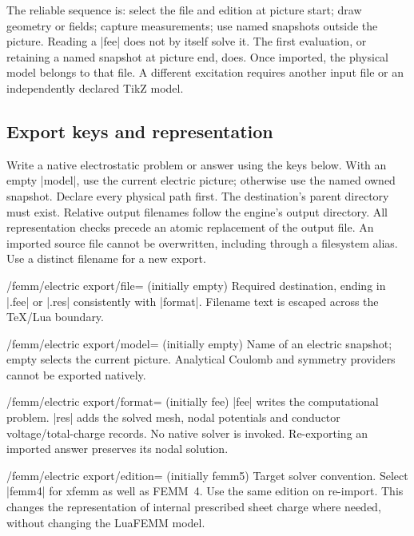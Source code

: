 The reliable sequence is: select the file and edition at picture start; draw
geometry or fields; capture measurements; use named snapshots outside the
picture. Reading a |fee| does not by itself solve it. The first evaluation, or
retaining a named snapshot at picture end, does. Once imported, the physical
model belongs to that file. A different excitation requires another input file
or an independently declared TikZ model.

\subsection{Export keys and representation}
\begin{command}{\femmelectricexport{}}
  Write a native electrostatic problem or answer using the keys below. With an
  empty |model|, use the current electric picture; otherwise use the named owned
  snapshot. Declare every physical path first. The destination's parent directory
  must exist. Relative output filenames follow the engine's output directory.
  All representation checks precede an atomic replacement of the output file.
  An imported source file cannot be overwritten, including through a filesystem
  alias. Use a distinct filename for a new export.
\end{command}
\begin{key}{/femm/electric export/file= (initially empty)}
  Required destination, ending in |.fee| or |.res| consistently with |format|.
  Filename text is escaped across the TeX/Lua boundary.
\end{key}
\begin{key}{/femm/electric export/model= (initially empty)}
  Name of an electric snapshot; empty selects the current picture.
  Analytical Coulomb and symmetry providers cannot be exported natively.
\end{key}
\begin{key}{/femm/electric export/format= (initially fee)}
  |fee| writes the computational problem. |res| adds the solved mesh, nodal
  potentials and conductor voltage/total-charge records. No native solver is
  invoked. Re-exporting an imported answer preserves its nodal solution.
\end{key}
\begin{key}{/femm/electric export/edition= (initially femm5)}
  Target solver convention. Select |femm4| for xfemm as well as FEMM~4.
  Use the same edition on re-import. This changes the representation of internal
  prescribed sheet charge where needed, without changing the LuaFEMM model.
\end{key}

